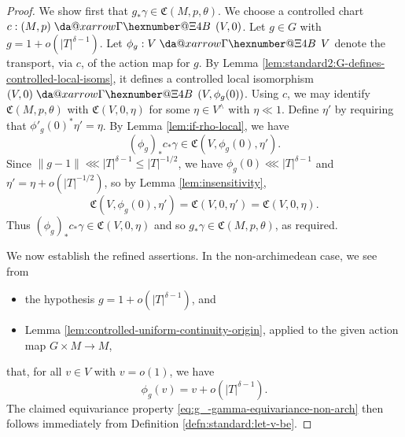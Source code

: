 \documentclass[reqno]{amsart}
\makeatletter
\newcommand*{\da@rightarrow}{\mathchar"0\hexnumber@\symAMSa 4B }
\newcommand*{\xdashrightarrow}[2][]{%
  \mathrel{%
    \mathpalette{\da@xarrow{#1}{#2}{}\da@rightarrow{\,}{}}{}%
  }%
}
\newcommand*{\da@xarrow}[7]{%
  \sbox0{$\ifx#7\scriptstyle\scriptscriptstyle\else\scriptstyle\fi#5#1#6\m@th$}%
  \sbox2{$\ifx#7\scriptstyle\scriptscriptstyle\else\scriptstyle\fi#5#2#6\m@th$}%
  \sbox4{$#7\dabar@\m@th$}%
  \dimen@=\wd0 %
  \ifdim\wd2 >\dimen@
    \dimen@=\wd2 %
  \fi
  \count@=2 %
  \def\da@bars{\dabar@\dabar@}%
  \@whiledim\count@\wd4<\dimen@\do{%
    \advance\count@\@ne
    \expandafter\def\expandafter\da@bars\expandafter{%
      \da@bars
      \dabar@ 
    }%
  }%
  \mathrel{#3}%
  \mathrel{%
    \mathop{\da@bars}\limits
    \ifx\\#1\\%
    \else
      _{\copy0}%
    \fi
    \ifx\\#2\\%
    \else
      ^{\copy2}%
    \fi
  }%
  \mathrel{#4}%
}
\theoremstyle{plain} \newtheorem{theorem} {Theorem}
\theoremstyle{definition} \newtheorem{definition} [theorem] {Definition}
\theoremstyle{itplain} %
\numberwithin{equation}{section}
\numberwithin{theorem}{section}
\renewcommand{\leq}{\leqslant}
\makeatother
\begin{document}
\begin{proof}
  We show first that $g_* \gamma \in \mathfrak{C}(M,p,\theta)$.  We choose a controlled chart $c : (M,p) \xdashrightarrow{} (V,0)$.  Let $g \in G$ with $g = 1 + o(|T|^{\delta-1})$.  Let $\phi_g : V \xdashrightarrow{} V$ denote the transport, via $c$, of the action map for $g$.  By Lemma \ref{lem:standard2:G-defines-controlled-local-isoms}, it defines a controlled local isomorphism $(V,0) \xdashrightarrow{} (V, \phi_g(0))$.  Using $c$, we may identify $\mathfrak{C}(M,p,\theta)$ with $\mathfrak{C}(V,0,\eta)$ for some $\eta \in V^\wedge$ with $\eta \ll 1$.  Define $\eta '$ by requiring that $\phi '_g(0)^* \eta ' = \eta$.  By Lemma \ref{lem:if-rho-local}, we have
\begin{equation*}
  (\phi_g)_* c_* \gamma \in \mathfrak{C}(V, \phi_g(0), \eta ').
\end{equation*}
Since $\|g - 1\| \lll |T|^{\delta-1} \leq |T|^{-1/2}$, we have $\phi_g(0) \lll |T|^{\delta-1}$ and  $\eta ' = \eta + o(|T|^{-1/2})$, so by Lemma \ref{lem:insensitivity},
\begin{equation*}
  \mathfrak{C}(V, \phi_g(0), \eta ')
  =
  \mathfrak{C}(V,0,\eta ') = \mathfrak{C}(V,0,\eta).
\end{equation*}
Thus $(\phi_g)_* c_* \gamma  \in \mathfrak{C}(V,0,\eta)$ and so $g_* \gamma \in \mathfrak{C}(M,p,\theta)$, as required.

We now establish the refined assertions.  In the non-archimedean case, we see from
\begin{itemize}
\item the hypothesis $g = 1 + o(|T|^{\delta-1})$,  and
\item Lemma \ref{lem:controlled-uniform-continuity-origin}, applied to the given action map $G \times M \rightarrow  M$,
\end{itemize}
that, for all $v \in V$ with $v = o(1)$, we have
\begin{equation*}
  \phi_g(v) = v + o(|T|^{\delta-1}).
\end{equation*}
The claimed equivariance property \eqref{eq:g_-gamma-equivariance-non-arch} then follows immediately from Definition \ref{defn:standard:let-v-be}.


\end{proof}
\end{document}
